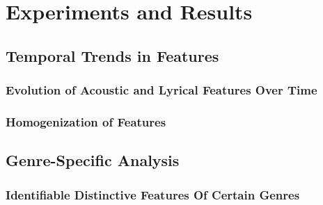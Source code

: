 \chapter{Experiments and Results}
\label{cha:experimentsandresults}

\section{Temporal Trends in Features}
\label{sec:temporaltrendsinfeatures}



\subsection{Evolution of Acoustic and Lyrical Features Over Time}
\label{sec:evolutionofacousticandlyricalfeaturesovertime}

\subsection{Homogenization of Features}
\label{sec:homogenizationoffeatures}


\section{Genre-Specific Analysis}
\label{sec:genrespecificanalysis}

\subsection{Identifiable Distinctive Features Of Certain Genres}
\label{sec:identifiabledistinctivefeaturesofcertaingenres}

